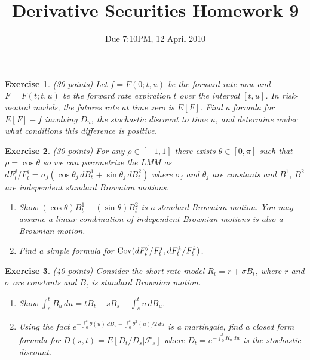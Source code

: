 \documentclass[11pt,fleqn]{amsproc}
\newcommand{\F}{\mathcal{F}}
\newcommand{\Cov}{\mathop{\rm{Cov}}}
\newtheorem{xca}{Exercise}
\begin{document}
\title{Derivative Securities Homework 9}
\author{Due 7:10PM, 12 April 2010}

\maketitle


\begin{xca}{(30 points)}
Let $f = F(0;t,u)$ be the forward rate now and $F = F(t;t,u)$
be the forward rate expiration $t$ over the interval $[t,u]$.
In risk-neutral models, the futures rate at time zero is
$E[F]$. Find a formula for $E[F] - f$ involving $D_u$, the
stochastic discount to time $u$, and determine
under what conditions this difference is positive.
\end{xca}

\begin{xca}{(30 points)}
For any $\rho\in[-1,1]$ there exists $\theta\in[0,\pi]$ such
that $\rho = \cos\theta$ so we can parametrize the LMM as
$dF^j_t/F^j_t = \sigma_j(\cos\theta_j\,dB^1_t + \sin\theta_j\,dB^2_t)$
where $\sigma_j$ and $\theta_j$ are constants and $B^1$, $B^2$
are independent standard Brownian motions.
\begin{enumerate}
\item Show $(\cos\theta)B^1_t + (\sin\theta)B^2_t$ is a standard
Brownian motion. You may assume a linear combination of independent
Brownian motions is also a Brownian motion.
\item Find a simple formula for $\Cov(dF^j_t/F^j_t,dF^k_t/F^k_t)$.
\end{enumerate}
\end{xca}

\begin{xca}{(40 points)}
Consider the short rate model $R_t = r + \sigma B_t$, where $r$
and $\sigma$ are constants and $B_t$ is standard Brownian motion.
\begin{enumerate}
\item Show $\int_s^t B_u\,du = tB_t - sB_s - \int_s^t u\,dB_u$.
\item Using the fact $e^{-\int_0^t\theta(u)\,dB_u - \int_0^t\theta^2(u)/2\,du}$
is a martingale, find a closed form formula for
$D(s,t) = E[D_t/D_s|\F_s]$ where $D_t = e^{-\int_0^t R_u\,du}$ is
the stochastic discount.
\end{enumerate}
\end{xca}
\end{document}
